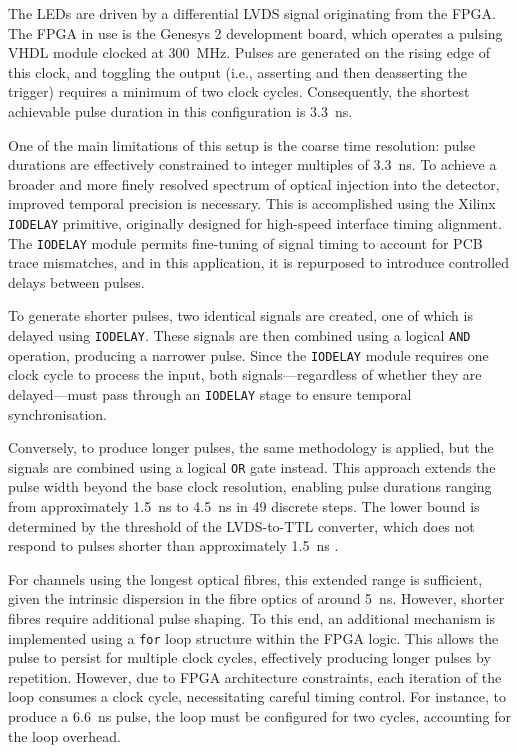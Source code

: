 \documentclass[a4paper,11pt]{article}
\begin{document}
The LEDs are driven by a differential LVDS signal originating from the FPGA. The FPGA in use is the Genesys 2 \cite{Genesys2} development board, which operates a pulsing VHDL module clocked at \SI{300}{\mega\hertz}. Pulses are generated on the rising edge of this clock, and toggling the output (i.e., asserting and then deasserting the trigger) requires a minimum of two clock cycles. Consequently, the shortest achievable pulse duration in this configuration is 3.3~ns.

One of the main limitations of this setup is the coarse time resolution: pulse durations are effectively constrained to integer multiples of \SI{3.3}{\nano\second}. To achieve a broader and more finely resolved spectrum of optical injection into the detector, improved temporal precision is necessary. This is accomplished using the Xilinx \texttt{IODELAY} primitive, originally designed for high-speed interface timing alignment. The \texttt{IODELAY} module permits fine-tuning of signal timing to account for PCB trace mismatches, and in this application, it is repurposed to introduce controlled delays between pulses.

To generate shorter pulses, two identical signals are created, one of which is delayed using \texttt{IODELAY}. These signals are then combined using a logical \texttt{AND} operation, producing a narrower pulse. Since the \texttt{IODELAY} module requires one clock cycle to process the input, both signals—regardless of whether they are delayed—must pass through an \texttt{IODELAY} stage to ensure temporal synchronisation.

Conversely, to produce longer pulses, the same methodology is applied, but the signals are combined using a logical \texttt{OR} gate instead. This approach extends the pulse width beyond the base clock resolution, enabling pulse durations ranging from approximately \SI{1.5}{\nano\second} to \SI{4.5}{\nano\second} in 49 discrete steps. The lower bound is determined by the threshold of the LVDS-to-TTL converter, which does not respond to pulses shorter than approximately \SI{1.5}{\nano\second} .

For channels using the longest optical fibres, this extended range is sufficient, given the intrinsic dispersion in the fibre optics of around \SI{5}{\nano\second}. However, shorter fibres require additional pulse shaping. To this end, an additional mechanism is implemented using a \texttt{for} loop structure within the FPGA logic. This allows the pulse to persist for multiple clock cycles, effectively producing longer pulses by repetition. However, due to FPGA architecture constraints, each iteration of the loop consumes a clock cycle, necessitating careful timing control. For instance, to produce a \SI{6.6}{\nano\second} pulse, the loop must be configured for two cycles, accounting for the loop overhead.
\end{document}
